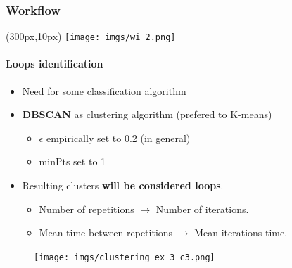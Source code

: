 \documentclass{beamer}
\begin{document}
\begin{frame}
\frametitle{Workflow}
\begin{textblock*}{5cm}(300px,10px) %
	\texttt{[image: imgs/wi\_2.png]}
\end{textblock*}
\framesubtitle{Loops identification}
\begin{multicols}{2}
\begin{itemize}
	\item Need for some classification algorithm
	\item \textbf{DBSCAN} as clustering algorithm (prefered to K-means)
	\begin{itemize}
		\item $\epsilon$ empirically set to 0.2 (in general)
		\item minPts set to 1
	\end{itemize}
	\item Resulting clusters \textbf{will be considered loops}.
	\begin{itemize}
		\item Number of repetitions $\rightarrow$ Number of iterations.
		\item Mean time between repetitions $\rightarrow$ Mean iterations time.
	\end{itemize}
\end{itemize}
\columnbreak
\begin{figure}
	\texttt{[image: imgs/clustering\_ex\_3\_c3.png]}
\end{figure}
\end{multicols}
\end{frame}
\end{document}

